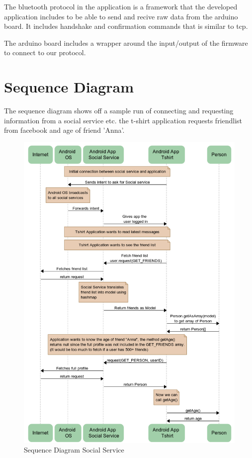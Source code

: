 The bluetooth protocol in the application is a framework that the developed application includes
to be able to send and recive raw data from the arduino board. It includes handshake and
confirmation commands that is similar to tcp.

The arduino board includes a wrapper around the input/output of the firmware to connect to our protocol.

\section{Sequence Diagram}
The sequence diagram shows off a sample run of connecting and requesting information from a social service etc. the t-shirt application requests friendlist from facebook and age of friend 'Anna'.
\newpage
\begin{figure}[h!]
\centering \includegraphics[width=1.0\textwidth]{img/sequenceDiagramSocialService.png} \caption{Sequence Diagram Social Service}
\label{fig:sequenceDiagramSocialService}
\end{figure}

